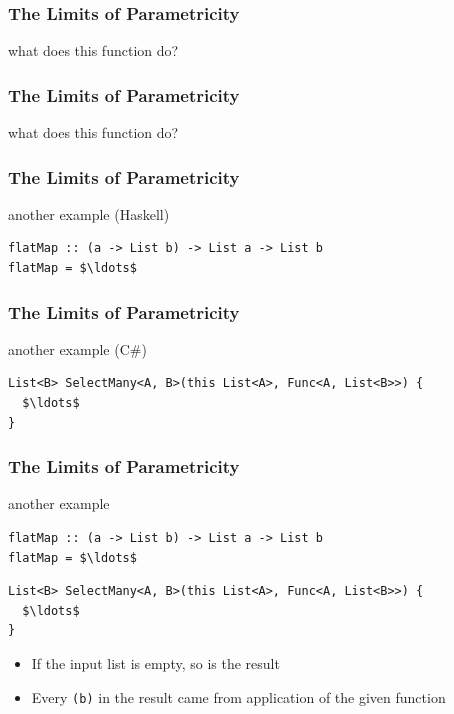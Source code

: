\begin{frame}[fragile]
\frametitle{The Limits of Parametricity}
\begin{block}{what does this function do?}

\end{block}
\end{frame}

\begin{frame}[fragile]
\frametitle{The Limits of Parametricity}
\begin{block}{what does this function do?}

\end{block}
\end{frame}

\begin{frame}[fragile]
\frametitle{The Limits of Parametricity}
\begin{block}{another example (Haskell)}
\begin{lstlisting}[style=haskell,mathescape]
flatMap :: (a -> List b) -> List a -> List b
flatMap = $\ldots$
\end{lstlisting}
\end{block}
\end{frame}

\begin{frame}[fragile]
\frametitle{The Limits of Parametricity}
\begin{block}{another example (C\#)}
\begin{lstlisting}[style=csharp,mathescape]
List<B> SelectMany<A, B>(this List<A>, Func<A, List<B>>) {
  $\ldots$
}
\end{lstlisting}
\end{block}
\end{frame}

\begin{frame}[fragile]
\frametitle{The Limits of Parametricity}
\begin{block}{another example}
\begin{lstlisting}[style=haskell,mathescape]
flatMap :: (a -> List b) -> List a -> List b
flatMap = $\ldots$
\end{lstlisting}
\begin{lstlisting}[style=csharp,mathescape]
List<B> SelectMany<A, B>(this List<A>, Func<A, List<B>>) {
  $\ldots$
}
\end{lstlisting}
\end{block}
\begin{itemize}
  \item If the input list is empty, so is the result
  \item Every \lstinline{(b)} in the result came from application of the given function
\end{itemize}
\end{frame}

